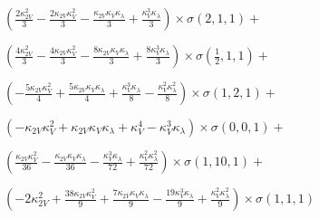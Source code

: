 $\left(\frac{2 \kappa_{2V}^{2}}{3} - \frac{2 \kappa_{2V} \kappa_{V}^{2}}{3} - \frac{\kappa_{2V} \kappa_{V} \kappa_{\lambda}}{3} + \frac{\kappa_{V}^{3} \kappa_{\lambda}}{3}\right) \times \sigma{\left(2,1,1 \right)} +$

$ \left(\frac{4 \kappa_{2V}^{2}}{3} - \frac{4 \kappa_{2V} \kappa_{V}^{2}}{3} - \frac{8 \kappa_{2V} \kappa_{V} \kappa_{\lambda}}{3} + \frac{8 \kappa_{V}^{3} \kappa_{\lambda}}{3}\right) \times \sigma{\left(\frac{1}{2},1,1 \right)} +$

$ \left(- \frac{5 \kappa_{2V} \kappa_{V}^{2}}{4} + \frac{5 \kappa_{2V} \kappa_{V} \kappa_{\lambda}}{4} + \frac{\kappa_{V}^{3} \kappa_{\lambda}}{8} - \frac{\kappa_{V}^{2} \kappa_{\lambda}^{2}}{8}\right) \times \sigma{\left(1,2,1 \right)} +$

$ \left(- \kappa_{2V} \kappa_{V}^{2} + \kappa_{2V} \kappa_{V} \kappa_{\lambda} + \kappa_{V}^{4} - \kappa_{V}^{3} \kappa_{\lambda}\right) \times \sigma{\left(0,0,1 \right)} +$

$ \left(\frac{\kappa_{2V} \kappa_{V}^{2}}{36} - \frac{\kappa_{2V} \kappa_{V} \kappa_{\lambda}}{36} - \frac{\kappa_{V}^{3} \kappa_{\lambda}}{72} + \frac{\kappa_{V}^{2} \kappa_{\lambda}^{2}}{72}\right) \times \sigma{\left(1,10,1 \right)} +$

$ \left(- 2 \kappa_{2V}^{2} + \frac{38 \kappa_{2V} \kappa_{V}^{2}}{9} + \frac{7 \kappa_{2V} \kappa_{V} \kappa_{\lambda}}{9} - \frac{19 \kappa_{V}^{3} \kappa_{\lambda}}{9} + \frac{\kappa_{V}^{2} \kappa_{\lambda}^{2}}{9}\right) \times \sigma{\left(1,1,1 \right)}$
